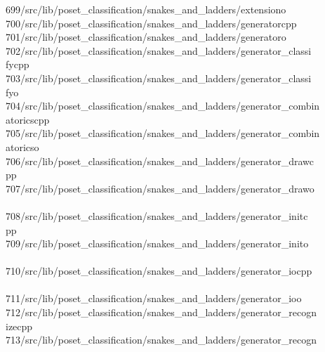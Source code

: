 \begin{tabbing}
699\>/src/lib/poset\_classification/snakes\_and\_ladders/extensiono\\[0pt]
700\>/src/lib/poset\_classification/snakes\_and\_ladders/generatorcpp\\[0pt]
701\>/src/lib/poset\_classification/snakes\_and\_ladders/generatoro\\[0pt]
702\>/src/lib/poset\_classification/snakes\_and\_ladders/generator\_classi\\[0pt]
\>fycpp\\[0pt]
703\>/src/lib/poset\_classification/snakes\_and\_ladders/generator\_classi\\[0pt]
\>fyo\\[0pt]
704\>/src/lib/poset\_classification/snakes\_and\_ladders/generator\_combin\\[0pt]
\>atoricscpp\\[0pt]
705\>/src/lib/poset\_classification/snakes\_and\_ladders/generator\_combin\\[0pt]
\>atoricso\\[0pt]
706\>/src/lib/poset\_classification/snakes\_and\_ladders/generator\_drawc\\[0pt]
\>pp\\[0pt]
707\>/src/lib/poset\_classification/snakes\_and\_ladders/generator\_drawo\\[0pt]
\>\\[0pt]
708\>/src/lib/poset\_classification/snakes\_and\_ladders/generator\_initc\\[0pt]
\>pp\\[0pt]
709\>/src/lib/poset\_classification/snakes\_and\_ladders/generator\_inito\\[0pt]
\>\\[0pt]
710\>/src/lib/poset\_classification/snakes\_and\_ladders/generator\_iocpp\\[0pt]
\>\\[0pt]
711\>/src/lib/poset\_classification/snakes\_and\_ladders/generator\_ioo\\[0pt]
712\>/src/lib/poset\_classification/snakes\_and\_ladders/generator\_recogn\\[0pt]
\>izecpp\\[0pt]
713\>/src/lib/poset\_classification/snakes\_and\_ladders/generator\_recogn\\[0pt]

\end{tabbing}
